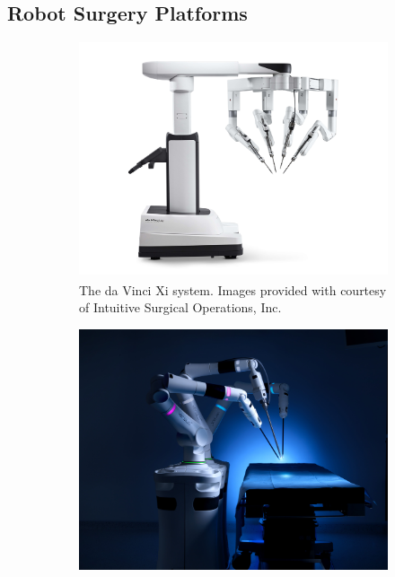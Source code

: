 \subsection{Robot Surgery Platforms}
\label{in:sec:robot_surgery_platforms}
\begin{figure}[tb]
    \centering
    \begin{subfigure}[b]{0.49\textwidth}
        \centering
        \includegraphics[width=\textwidth]{introduction/img/JPG_Large-DV_SYS_Xi_PatientCart_PRF_RGB-min.jpg}
        \caption{The da Vinci\textsuperscript{\textregistered} Xi system. Images provided with courtesy of  Intuitive Surgical Operations, Inc.}
        \label{in:fig:da_vinci}
    \end{subfigure}
    \begin{subfigure}[b]{0.49\textwidth}
        \centering
        \includegraphics[width=\textwidth]{introduction/img/Product-Versius-3-Arm-Setup-B.jpg}

\end{subfigure}
\end{figure}
